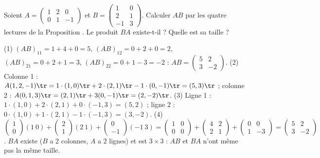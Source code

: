 \begin{exo}
Soient $A=\begin{pmatrix}1&2&0\\0&1&-1\end{pmatrix}$ et $B=\begin{pmatrix}1&0\\2&1\\-1&3\end{pmatrix}$. Calculer $AB$ par les quatre lectures de la Proposition . Le produit $BA$ existe-t-il ? Quelle est sa taille ?
\begin{corrige}
(1) $(AB)_{11}=1+4+0=5$, $(AB)_{12}=0+2+0=2$, $(AB)_{21}=0+2+1=3$, $(AB)_{22}=0+1-3=-2$ : $AB=\begin{pmatrix}5&2\\3&-2\end{pmatrix}$.
(2) Colonne 1 : $A(1,2,-1)\tr=1\cdot(1,0)\tr+2\cdot(2,1)\tr-1\cdot(0,-1)\tr=(5,3)\tr$ ; colonne 2 : $A(0,1,3)\tr=(2,1)\tr+3(0,-1)\tr=(2,-2)\tr$.
(3) Ligne 1 : $1\cdot(1,0)+2\cdot(2,1)+0\cdot(-1,3)=(5,2)$ ; ligne 2 : $0\cdot(1,0)+1\cdot(2,1)-1\cdot(-1,3)=(3,-2)$.
(4) $\begin{pmatrix}1\\0\end{pmatrix}(1\ 0)+\begin{pmatrix}2\\1\end{pmatrix}(2\ 1)+\begin{pmatrix}0\\-1\end{pmatrix}(-1\ 3)=\begin{pmatrix}1&0\\0&0\end{pmatrix}+\begin{pmatrix}4&2\\2&1\end{pmatrix}+\begin{pmatrix}0&0\\1&-3\end{pmatrix}=\begin{pmatrix}5&2\\3&-2\end{pmatrix}$.
$BA$ existe ($B$ a 2 colonnes, $A$ a 2 lignes) et est $3\times3$ : $AB$ et $BA$ n'ont même pas la même taille.
\end{corrige}
\end{exo}
